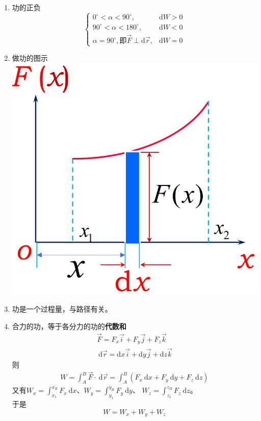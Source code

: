 \documentclass[
	12pt, %
	a4paper, %
]{myLegrandOrangeBook}
\newcommand{\rmd}{\mathrm{d}}
\begin{document}
\begin{enumerate}
    \item 功的正负
        $$
            \begin{cases}0^{\circ}<\alpha<90^{\circ}, & \mathrm{d} W>0 \\
            90^{\circ}<\alpha<180^{\circ}, & \mathrm{d} W<0 \\
            \alpha=90^{\circ}, \text{即} \overrightarrow{F} \perp \rmd \overrightarrow{r}, & \rmd W=0\end{cases}
        $$
    \item 做功的图示\\
        {
        \centering
        \includegraphics[scale=0.2]{"Chapter 03 images/pic2.png"}
        }
    \item 功是一个过程量，与路径有关。
    \item 合力的功，等于各分力的功的\textbf{代数和}
        \begin{align*}
            \overrightarrow{F}=F_x \overrightarrow{i}+F_y \overrightarrow{j}+F_z \overrightarrow{k} \\
            \mathrm{~d} \overrightarrow{r}=\mathrm{d} x \overrightarrow{i}+\mathrm{d} y \overrightarrow{j}+\mathrm{d} z \overrightarrow{k}
        \end{align*}
        则
        \begin{align*}
            W=\int_A^B \overrightarrow{F} \cdot \mathrm{~d} \overrightarrow{r}=
            \int_A^B\left(F_x \mathrm{~d} x+F_y \mathrm{~d} y+F_z \mathrm{~d} z\right)
        \end{align*}
        又有$W_x=\int_{x_1}^{x_B} F_x \mathrm{~d} x$、$W_y=\int_{y_1}^{y_B} F_y \mathrm{~d} y$、
        $W_z=\int_{z_1}^{z_B} F_z\mathrm{~d} z$。\\
        于是
        \[
            W = W_x + W_y + W_z
        \]

\end{enumerate}
\end{document}
